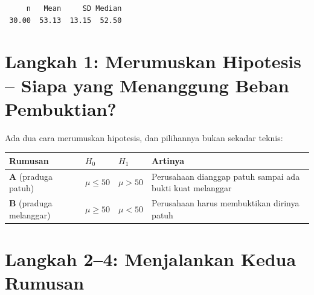 \documentclass[
  indonesian,
  letterpaper,
]{book}
\newcounter{none} %
\begin{document}
\begin{verbatim}
     n   Mean     SD Median 
 30.00  53.13  13.15  52.50 
\end{verbatim}

\section{Langkah 1: Merumuskan Hipotesis -- Siapa yang Menanggung Beban
Pembuktian?}\label{langkah-1-merumuskan-hipotesis-siapa-yang-menanggung-beban-pembuktian}

Ada dua cara merumuskan hipotesis, dan pilihannya bukan sekadar teknis:

{\def\LTcaptype{none} %
\begin{longtable}[]{@{}
  >{\raggedright\arraybackslash}p{}
  >{\centering\arraybackslash}p{}
  >{\centering\arraybackslash}p{}
  >{\raggedright\arraybackslash}p{}@{}}
\toprule\noalign{}
\begin{minipage}[b]{\linewidth}\raggedright
Rumusan
\end{minipage} & \begin{minipage}[b]{\linewidth}\centering
\(H_0\)
\end{minipage} & \begin{minipage}[b]{\linewidth}\centering
\(H_1\)
\end{minipage} & \begin{minipage}[b]{\linewidth}\raggedright
Artinya
\end{minipage} \\
\midrule\noalign{}
\endhead
\bottomrule\noalign{}
\endlastfoot
\textbf{A} (praduga patuh) & \(\mu \leq 50\) & \(\mu > 50\) & Perusahaan
dianggap patuh sampai ada bukti kuat melanggar \\
\textbf{B} (praduga melanggar) & \(\mu \geq 50\) & \(\mu < 50\) &
Perusahaan harus membuktikan dirinya patuh \\
\end{longtable}
}

\section{Langkah 2--4: Menjalankan Kedua
Rumusan}\label{langkah-24-menjalankan-kedua-rumusan}
\end{document}
